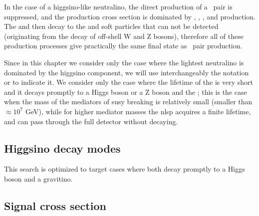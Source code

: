 In the case of a higgsino-like neutralino, the direct production of a \ninoone\ninoone\ pair is suppressed, and the production cross section is dominated by 
\ninoone\ninotwo, \ninoone\chinoonepm, \ninotwo\chinoonepm, and \chinoonep\chinoonem production.
The \ninotwo and \chinoonepm then decay to the \ninoone and soft particles that can not be detected (originating from the 
decay of off-shell W and Z bosons), therefore all of these production processes give practically the same final state as 
\ninoone\ninoone\  pair production. 

Since in this chapter we consider only the case where the lightest neutralino is dominated by the higgsino component,
we will use interchangeably the notation \ninoone or \hino to indicate it.  
We consider only the case where the lifetime of the \hino is very short and it decays promptly to a Higgs boson or a Z boson and the \gravino;
this is the case when the mass of the mediators of \gls{susy} breaking is relatively small (smaller than $\approx 10^7$ GeV), 
while for higher mediator masses the \gls{nlsp} acquires a finite lifetime, and can pass through the full detector without decaying. 


\subsection{Higgsino decay modes}

This search is optimized to target cases where both \hino decay promptly to a Higgs boson and a gravitino. 

\subsection{Signal cross section}


